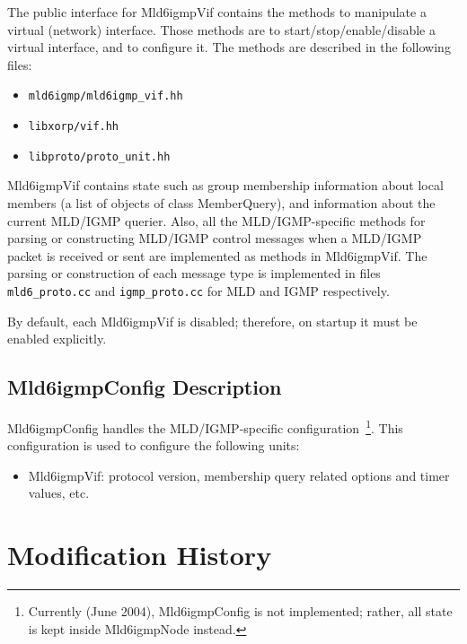 \documentclass[11pt]{article}
\begin{document}
The public interface for Mld6igmpVif contains the methods to manipulate a
virtual (network) interface. Those methods are to start/stop/enable/disable a
virtual interface, and to configure it. The methods are described in
the following files:

\begin{itemize}
  \item \verb=mld6igmp/mld6igmp_vif.hh=
  \item \verb=libxorp/vif.hh=
  \item \verb=libproto/proto_unit.hh=
\end{itemize}

Mld6igmpVif contains state such as group membership information about
local members (a list of objects of class MemberQuery), and information
about the current MLD/IGMP querier. Also, all 
the MLD/IGMP-specific methods for parsing or constructing MLD/IGMP control
messages when a MLD/IGMP packet is received or sent are implemented as
methods in Mld6igmpVif. The parsing or construction of each message type is
implemented in files \verb=mld6_proto.cc= and \verb=igmp_proto.cc=
for MLD and IGMP respectively.

By default, each Mld6igmpVif is disabled; therefore, on startup it must
be enabled explicitly.


\subsection{Mld6igmpConfig Description}

Mld6igmpConfig handles the MLD/IGMP-specific
configuration~\footnote{Currently (June 2004), Mld6igmpConfig is not
implemented; rather, all state is kept inside Mld6igmpNode instead.}. This
configuration is used to configure the following units:

\begin{itemize}

  \item Mld6igmpVif: protocol version, membership query related options
  and timer values, etc.

\end{itemize}


\appendix
\section{Modification History}
\end{document}
